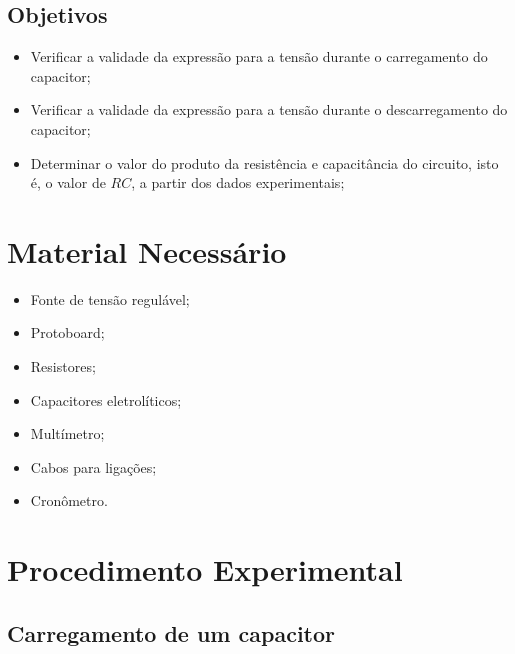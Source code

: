\subsection{Objetivos}
\label{Sec:ObjetivosCargaEDescargaCapacitor}

\begin{itemize}
	\item Verificar a validade da expressão para a tensão durante o carregamento do capacitor;
	\item Verificar a validade da expressão para a tensão durante o descarregamento do capacitor;
	\item Determinar o valor do produto da resistência e capacitância do circuito, isto é, o valor de $RC$, a partir dos dados experimentais;
\end{itemize}

\section{Material Necessário}

\begin{itemize}
	\item Fonte de tensão regulável;
	\item Protoboard;
	\item Resistores;
	\item Capacitores eletrolíticos;
	\item Multímetro;
	\item Cabos para ligações;
	\item Cronômetro.
\end{itemize}

\section{Procedimento Experimental}

\subsection{Carregamento de um capacitor}

